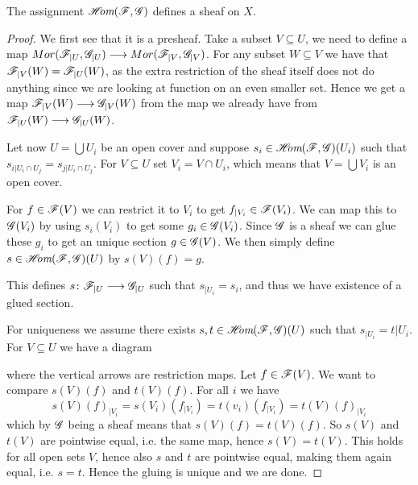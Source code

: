 \begin{proposition}
The assignment $\mathscr{H}\hspace{-1mm}\textit{om}(\mathscr{F}, \mathscr{G})$ defines a sheaf on $X$. 
\begin{proof}
We first see that it is a presheaf. Take a subset $V\subseteq U$, we need to define a map $Mor(\mathscr{F}_{\vert U}, \mathscr{G}_{\vert U})\longrightarrow Mor(\mathscr{F}_{\vert V}, \mathscr{G}_{\vert V})$. For any subset $W\subseteq V$ we have that $\mathscr{F}_{\vert V}(W)=\mathscr{F}_{\vert U}(W)$, as the extra restriction of the sheaf itself does not do anything since we are looking at function on an even smaller set. Hence we get a map $\mathscr{F}_{\vert V}(W)\longrightarrow \mathscr{G}_{\vert V}(W)$ from the map we already have from $\mathscr{F}_{\vert U}(W)\longrightarrow \mathscr{G}_{\vert U}(W)$. 

Let now $U=\bigcup U_i$ be an open cover and suppose $s_i\in \mathscr{H}\hspace{-1mm}\textit{om}(\mathscr{F}, \mathscr{G})(U_i)$ such that $s_{i\vert U_i\cap U_j} = s_{j\vert U_i\cap U_j}$. For $V\subseteq U$ set $V_i=V\cap U_i$, which means that $V=\bigcup V_i$ is an open cover. 

For $f\in \mathscr{F}(V)$ we can restrict it to $V_i$ to get $f_{\vert V_i}\in \mathscr{F}(V_i)$. We can map this to $\mathscr{G}(V_i)$ by using $s_i(V_i)$ to get some $g_i\in \mathscr{G}(V_i)$. Since $\mathscr{G}$ is a sheaf we can glue these $g_i$ to get an unique section $g\in \mathscr{G}(V)$. We then simply define $s\in \mathscr{H}\hspace{-1mm}\textit{om}(\mathscr{F}, \mathscr{G})(U)$ by $s(V)(f)=g$.

This defines $s\colon \mathscr{F}_{\vert U}\longrightarrow \mathscr{G}_{\vert U}$ such that $s_{\vert U_i}=s_i$, and thus we have existence of a glued section.

For uniqueness we assume there exists $s, t\in \mathscr{H}\hspace{-1mm}\textit{om}(\mathscr{F}, \mathscr{G})(U)$ such that $s_{\vert U_i}=t{\vert U_i}$. For $V\subseteq U$ we have a diagram

\begin{center}
\end{center}
where the vertical arrows are restriction maps. Let $f\in \mathscr{F}(V)$. We want to compare $s(V)(f)$ and $t(V)(f)$. For all $i$ we have
\begin{equation*}
    s(V)(f)_{\vert V_i} = s(V_i)(f_{\vert V_i}) = t(v_i)(f_{\vert V_i})=t(V)(f)_{\vert V_i}
\end{equation*}
which by $\mathscr{G}$ being a sheaf means that $s(V)(f)=t(V)(f)$. So $s(V)$ and $t(V)$ are pointwise equal, i.e. the same map, hence $s(V)=t(V)$. This holds for all open sets $V$, hence also $s$ and $t$ are pointwise equal, making them again equal, i.e. $s=t$. Hence the gluing is unique and we are done.
\end{proof}
\end{proposition}

